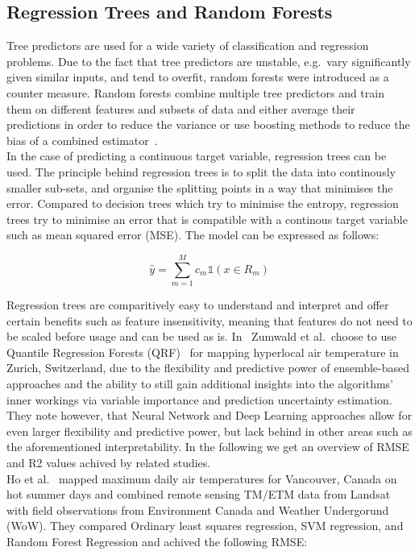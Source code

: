\subsection{Regression Trees and Random Forests}

Tree predictors are used for a wide variety of classification and regression problems. Due to the fact that tree predictors are unstable, e.g.\ vary significantly given similar inputs, and tend to overfit, random forests were introduced as a counter measure. Random forests combine multiple tree predictors and train them on different features and subsets of data and either average their predictions in order to reduce the variance or use boosting methods to reduce the bias of a combined estimator~\cite{breiman2001random}.\\
In the case of predicting a continuous target variable, regression trees can be used. The principle behind regression trees is to split the data into continously smaller sub-sets, and organise the splitting points in a way that minimises the error. Compared to decision trees which try to minimise the entropy, regression trees try to minimise an error that is compatible with a continous target variable such as mean squared error (MSE). The model can be expressed as follows:

\begin{equation}
    \hat{y} = \sum_{m=1}^M c_m \mathbb{1}(x \in R_m)
\end{equation}

Regression trees are comparitively easy to understand and interpret and offer certain benefits such as feature insensitivity, meaning that features do not need to be scaled before usage and can be used as is. In~\cite{zumwald2021mapping} Zumwald et al.\ choose to use Quantile Regression Forests (QRF)~\cite{meinshausen2006quantile} for mapping hyperlocal air temperature in Zurich, Switzerland, due to the flexibility and predictive power of ensemble-based approaches and the ability to still gain additional insights into the algorithms' inner workings via variable importance and prediction uncertainty estimation. They note however, that Neural Network and Deep Learning approaches allow for even larger flexibility and predictive power, but lack behind in other areas such as the aforementioned interpretability. In the following we get an overview of RMSE and R2 values achived by related studies.\\
Ho et al.~\cite{ho2014mapping} mapped maximum daily air temperatures for Vancouver, Canada on hot summer days and combined remote sensing TM/ETM data from Landsat with field observations from Environment Canada and Weather Undergorund (WoW). They compared Ordinary least squares regression, SVM regression, and Random Forest Regression and achived the following RMSE:

